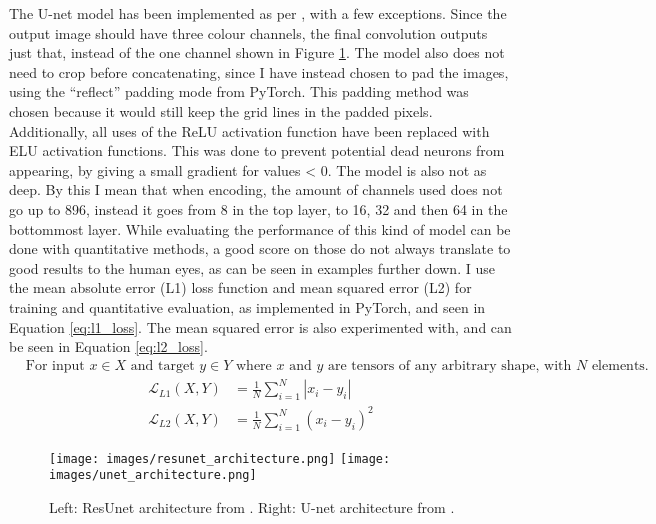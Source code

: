 The U-net model has been implemented as per \cite{unet}, with a few exceptions. Since the output image should have three colour channels, the final convolution outputs just that, instead of the one channel shown in Figure \ref{img:architectures}. The model also does not need to crop before concatenating, since I have instead chosen to pad the images, using the ``reflect'' padding mode from PyTorch. This padding method was chosen because it would still keep the grid lines in the padded pixels. Additionally, all uses of the ReLU activation function have been replaced with ELU activation functions. This was done to prevent potential dead neurons from appearing, by giving a small gradient for values < 0. The model is also not as deep. By this I mean that when encoding, the amount of channels used does not go up to 896, instead it goes from 8 in the top layer, to 16, 32 and then 64 in the bottommost layer. While evaluating the performance of this kind of model can be done with quantitative methods, a good score on those do not always translate to good results to the human eyes, as can be seen in examples further down. I use the mean absolute error (L1) loss function and mean squared error (L2) for training and quantitative evaluation, as implemented in PyTorch, and seen in Equation \ref{eq:l1_loss}. The mean squared error is also experimented with, and can be seen in Equation \ref{eq:l2_loss}.
\begin{align*}
  &\text{For input $x\in X$ and target $y\in Y$ where $x$ and $y$ are tensors of any arbitrary shape, with $N$ elements.}
\end{align*}
\begin{align}
  \mathcal{L}_{L1}(X,Y) &= \frac{1}{N} \sum^N_{i=1} |x_i - y_i| \label{eq:l1_loss}\\
  \mathcal{L}_{L2}(X,Y) &= \frac{1}{N} \sum^N_{i=1} (x_i - y_i)^2 \label{eq:l2_loss}
\end{align}

\begin{figure}[H]
  \centering
  \captionsetup{justification=centering}
  \texttt{[image: images/resunet\_architecture.png]}
  \texttt{[image: images/unet\_architecture.png]}
  \caption[center]{Left: ResUnet architecture from \cite{resunet}. Right: U-net architecture from \cite{unet}.}\label{img:architectures}
\end{figure}

